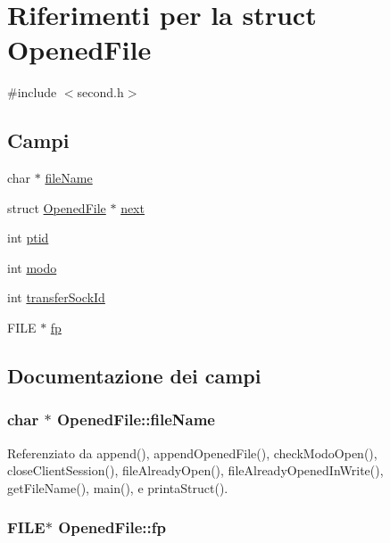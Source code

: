 \hypertarget{structOpenedFile}{\section{Riferimenti per la struct Opened\+File}
\label{structOpenedFile}
}


{\ttfamily \#include $<$second.\+h$>$}

\subsection*{Campi}
\begin{DoxyCompactItemize}
\item 
char $\ast$ \hyperlink{structOpenedFile_abcff0610dfa8b1e3836b3f5bac40c8f5}{file\+Name}
\item 
struct \hyperlink{structOpenedFile}{Opened\+File} $\ast$ \hyperlink{structOpenedFile_a9b8c8b995cdda6da249a6ce9a9df98b2}{next}
\item 
int \hyperlink{structOpenedFile_aba1e9ae457adfa6a9cc6a22ca4ee290d}{ptid}
\item 
int \hyperlink{structOpenedFile_a6d9f22ff6ba81506ba9c4a60f27c4f32}{modo}
\item 
int \hyperlink{structOpenedFile_a122a7d3d722dc1f7c63857af2024f098}{transfer\+Sock\+Id}
\item 
F\+I\+L\+E $\ast$ \hyperlink{structOpenedFile_a9cdcaccacb2eb66a17c0781666c28b15}{fp}
\end{DoxyCompactItemize}


\subsection{Documentazione dei campi}
\hypertarget{structOpenedFile_abcff0610dfa8b1e3836b3f5bac40c8f5}{
\subsubsection[{file\+Name}]{\setlength{\rightskip}{0pt plus 5cm}char $\ast$ Opened\+File\+::file\+Name}}\label{structOpenedFile_abcff0610dfa8b1e3836b3f5bac40c8f5}


Referenziato da append(), append\+Opened\+File(), check\+Modo\+Open(), close\+Client\+Session(), file\+Already\+Open(), file\+Already\+Opened\+In\+Write(), get\+File\+Name(), main(), e printa\+Struct().

\hypertarget{structOpenedFile_a9cdcaccacb2eb66a17c0781666c28b15}{
\subsubsection[{fp}]{\setlength{\rightskip}{0pt plus 5cm}F\+I\+L\+E$\ast$ Opened\+File\+::fp}}\label{structOpenedFile_a9cdcaccacb2eb66a17c0781666c28b15}


